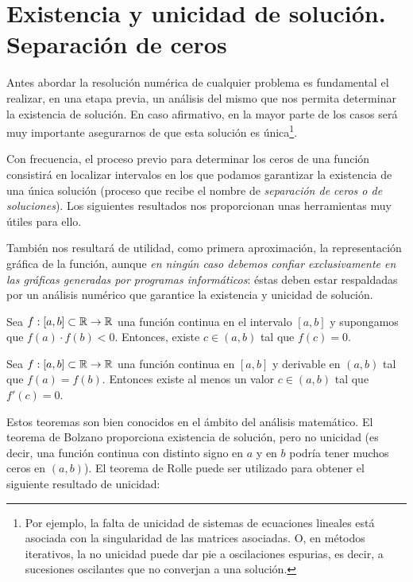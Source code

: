 \section{Existencia y unicidad de solución. Separación de ceros}
\label{sec:tema1:exist-y-unic}

Antes abordar la resolución numérica de cualquier problema es
fundamental el realizar, en una etapa previa, un análisis del mismo
que nos permita determinar la existencia de solución. En caso
afirmativo, en la mayor parte de los casos será muy importante
asegurarnos de que esta solución es única\footnote{Por ejemplo,
  la falta de unicidad de sistemas de ecuaciones lineales está
  asociada con la singularidad de las matrices asociadas. O, en
  métodos iterativos, la no unicidad puede dar pie a
  oscilaciones espurias, es decir, a sucesiones oscilantes que no
  converjan a una solución.}.

Con frecuencia, el proceso previo para determinar los ceros de una
función consistirá en localizar intervalos en los que podamos
garantizar la existencia de una única solución (proceso que recibe el
nombre de \textit{separación de ceros o de soluciones}). Los
siguientes resultados nos proporcionan unas herramientas muy útiles
para ello.

También nos resultará de utilidad, como primera aproximación, la
representación gráfica de la función, aunque \textit{en ningún caso
  debemos confiar exclusivamente en las gráficas generadas por
  programas informáticos}: éstas deben estar respaldadas por un
análisis numérico que garantice la existencia y unicidad de solución.

\begin{theorem}[Bolzano]
  \label{thm:bolzano}
  Sea $f:[a,b]\subset \operatorname{{\mathbb R}}\to\operatorname{{\mathbb R}}$ una función continua en el
  intervalo $[a, b]$ y supongamos que $f (a)\cdot f (b) < 0$.
  Entonces, existe $c\in(a, b)$ tal que $f (c) = 0$.
\end{theorem}

\begin{theorem}[Rolle]
  \label{thm:rolle}
  Sea $f:[a,b]\subset \operatorname{{\mathbb R}}\to\operatorname{{\mathbb R}}$ una función continua en $[a, b]$ y derivable en
  $(a, b)$ tal que $f(a) = f(b)$.
  Entonces existe al menos un valor $c \in (a, b)$ tal que $f'(c) = 0$.
\end{theorem}

Estos teoremas son bien conocidos en el ámbito del análisis
matemático. El teorema de Bolzano proporciona existencia de solución,
pero no unicidad (es decir, una función continua con distinto signo en
$a$ y en $b$ podría tener muchos ceros en $(a,b)$). El teorema de
Rolle puede ser utilizado para obtener el siguiente resultado de
unicidad:

